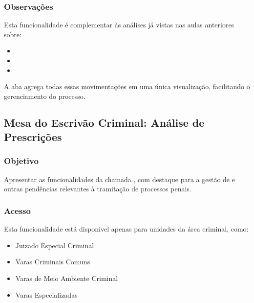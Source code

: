\documentclass[letterpaper,10pt,brazil]{sphinxmanual}
\begin{document}
\subsubsection{Observações}
\label{\detokenize{projud_60_contagemprazosprocessuais:observacoes}}
\sphinxAtStartPar
Esta funcionalidade é complementar às análises já vistas nas aulas anteriores sobre:
\begin{itemize}
\item {} 
\sphinxAtStartPar
{}

\item {} 
\sphinxAtStartPar
{}

\item {} 
\sphinxAtStartPar
{}

\end{itemize}

\sphinxAtStartPar
A aba  agrega todas essas movimentações em uma única visualização, facilitando o gerenciamento do processo.

\sphinxstepscope


\subsection{Mesa do Escrivão Criminal: Análise de Prescrições}
\label{\detokenize{projud_61_acompanhamentoprescricao:mesa-do-escrivao-criminal-analise-de-prescricoes}}\label{\detokenize{projud_61_acompanhamentoprescricao::doc}}

\subsubsection{Objetivo}
\label{\detokenize{projud_61_acompanhamentoprescricao:objetivo}}
\sphinxAtStartPar
Apresentar as funcionalidades da  chamada , com destaque para a gestão de  e outras pendências relevantes à tramitação de processos penais.


\subsubsection{Acesso}
\label{\detokenize{projud_61_acompanhamentoprescricao:acesso}}
\sphinxAtStartPar
Esta funcionalidade está disponível apenas para unidades da área criminal, como:
\begin{itemize}
\item {} 
\sphinxAtStartPar
Juizado Especial Criminal

\item {} 
\sphinxAtStartPar
Varas Criminais Comuns

\item {} 
\sphinxAtStartPar
Varas de Meio Ambiente Criminal

\item {} 
\sphinxAtStartPar
Varas Especializadas

\end{itemize}
\end{document}
